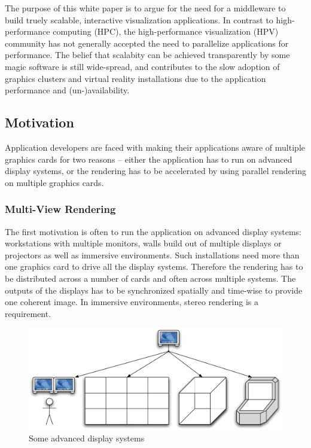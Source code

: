 \documentclass[10pt,a4paper]{scrartcl}
\begin{document}
The purpose of this white paper is to argue for the need for a middleware to
build truely scalable, interactive visualization applications. In
contrast to high-performance computing (HPC), the high-performance
visualization (HPV) community has not generally accepted the need to
parallelize applications for performance. The belief that scalabity can be
achieved transparently by some magic software is still wide-spread, and
contributes to the slow adoption of graphics clusters and virtual reality
installations due to the application performance and (un-)availability.


\subsection{Motivation}
Application developers are faced with making their applications
aware of multiple graphics cards for two reasons -- either the
application has to run on advanced display systems, or the rendering has
to be accelerated by using parallel rendering on multiple graphics cards.

\subsubsection{Multi-View Rendering}
The first motivation is often to run the application on advanced display
systems: workstations with multiple monitors, walls build out of
multiple displays or projectors as well as immersive environments. Such
installations need more than one graphics card to drive all the display
systems. Therefore the rendering has to be distributed across a
number of cards and often across multiple systems. The outputs of the
displays has to be synchronized spatially and time-wise to provide one
coherent image. In immersive environments, stereo rendering is a requirement.

\begin{figure}[ht]
\centering
\includegraphics[width=0.9\columnwidth]{images/sp_to_mp.pdf}
\caption{Some advanced display systems}
\label{FIG_parallel}
\end{figure}
\end{document}
